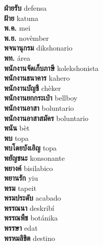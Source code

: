 \textbf{ ฝ่ายรับ  } defensa \\
\textbf{ ฝ้าย  } katuna \\
\textbf{ พ.ค.  } mei \\
\textbf{ พ.ย.  } novèmber \\
\textbf{ พจนานุกรม  } dikshonario \\
\textbf{ พท.  } área \\
\textbf{ พนักงานจัดเก็บภาษี  } kolekshonista \\
\textbf{ พนักงานธนาคาร  } kahero \\
\textbf{ พนักงานบัญชี  } chèker \\
\textbf{ พนักงานยกกระเป๋า  } bellboy \\
\textbf{ พนักงานอาสา  } boluntario \\
\textbf{ พนักงานอาสาสมัคร  } boluntario \\
\textbf{ พนัน  } bèt \\
\textbf{ พบ  } topa \\
\textbf{ พบโดยบังเอิญ  } topa \\
\textbf{ พยัญชนะ  } konsonante \\
\textbf{ พยางค์  } bisilabico \\
\textbf{ พยานรัก  } yiu \\
\textbf{ พรม  } tapeit \\
\textbf{ พรมประดับ  } acabado \\
\textbf{ พรรณนา  } deskribí \\
\textbf{ พรรณพืช  } botánika \\
\textbf{ พรรษา  } edat \\
\textbf{ พรหมลิขิต  } destino \\
